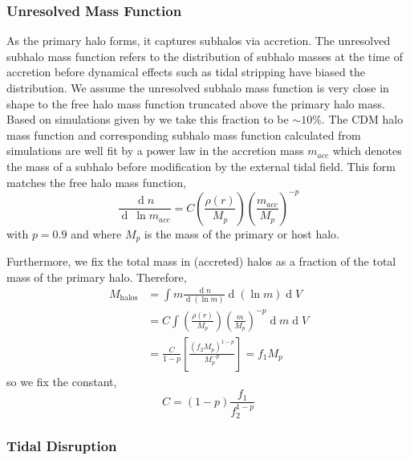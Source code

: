 \documentclass[usenatbib]{mnras}
\renewcommand{\d}[1]{\! \mathrm{d}#1 \:}
\newcommand{\deriv}[2]{\frac{\d{#1}}{\d{#2}}}
\renewcommand{\d}[1]{\ensuremath{\operatorname{d}\!{#1}}}
\begin{document}
\subsubsection{Unresolved Mass Function}

As the primary halo forms, it captures subhalos via accretion. The unresolved subhalo mass function refers to the distribution of subhalo masses at the time of accretion before dynamical effects such as tidal stripping have biased the distribution. We assume the unresolved subhalo mass function is very close in shape to the free halo mass function truncated above the primary halo mass. Based on simulations given by \citet{dark_wave} we take this fraction to be $\sim 10\%$. The CDM halo mass function and corresponding subhalo mass function calculated from simulations \citep{pop_of_subhalos, unified_model} are well fit by a power law in the accretion mass $m_{acc}$ which denotes the mass of a subhalo before modification by the external tidal field. This form matches the free halo mass function, 
\begin{equation}
\frac{\d{n}}{\d{\: \ln{m_{acc}}}} = C \left(\frac{\rho(r)}{M_p}\right) \left(\frac{m_{acc}}{M_p} \right)^{-p} 
\end{equation}
with $p = 0.9$ and where $M_p$ is the mass of the primary or host halo.
\par
Furthermore, we fix the total mass in (accreted) halos as a fraction of the total mass of the primary halo. Therefore,
\begin{subequations}
\begin{align}
M_{\mathrm{halos}} & = \int m \deriv{n}{(\ln{m})} \d{(\ln{m})} \d{V}
\\
& = C \int \left(\frac{\rho(r)}{M_p}\right) \left(\frac{m}{M_p} \right)^{-p} \d{m} \d{V} 
\\
& = \frac{C}{1-p} \left[ \frac{(f_2 M_p)^{1-p}}{M_p^{-p}} \right] = f_1 M_p 
\end{align} 
\end{subequations}
so we fix the constant,
\begin{equation}
C = (1 - p)\frac{f_1}{f_2^{1-p}} 
\end{equation}

\subsubsection{Tidal Disruption} 
\end{document}
